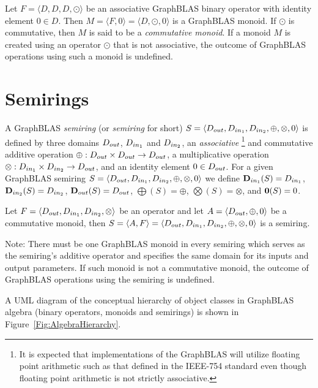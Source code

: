 Let $F = \langle D,D,D,\odot \rangle$ be an associative GraphBLAS binary operator
with identity element $0 \in D$.  Then $M = \langle F,0 \rangle = \langle
D,\odot,0 \rangle$ is a GraphBLAS monoid. If $\odot$ is commutative,
then $M$ is said to be a \emph{commutative monoid}.
If a monoid $M$ is created using an operator $\odot$ that is
not associative, the outcome of GraphBLAS operations using such a monoid is undefined.

\section{Semirings}

A GraphBLAS \emph{semiring} (or \emph{semiring} for short)
$S=\langle \mbox{$D_{out}$}, \mbox{$D_{in_{1}}$}, \mbox{$D_{in_{2}}$}, \oplus, \otimes, 0 \rangle$ is defined by
three domains $\mbox{$D_{out}$}$, $\mbox{$D_{in_{1}}$}$ and $\mbox{$D_{in_{2}}$}$, an \emph{associative}
\footnote{\label{Foot:associative}It is expected 
that implementations of the GraphBLAS will utilize floating point arithmetic 
such as that defined in the IEEE-754 standard even though
floating point arithmetic is not strictly associative.} 
and commutative
additive operation $\oplus : \mbox{$D_{out}$} \times \mbox{$D_{out}$} \rightarrow \mbox{$D_{out}$}$, 
a multiplicative operation $\otimes : \mbox{$D_{in_{1}}$} \times \mbox{$D_{in_{2}}$} \rightarrow
\mbox{$D_{out}$}$, and an identity element $0 \in \mbox{$D_{out}$}$.
For a given GraphBLAS semiring $S=\langle \mbox{$D_{out}$}, \mbox{$D_{in_{1}}$},
\mbox{$D_{in_{2}}$}, \oplus,\otimes,0 \rangle$ we define $\mbox{$\mathbf{D}_{in_{1}}$}(S) = \mbox{$D_{in_{1}}$}$,
$\mbox{$\mathbf{D}_{in_{2}}$}(S) = \mbox{$D_{in_{2}}$}$, $\mbox{$\mathbf{D}_{out}$}(S) = \mbox{$D_{out}$}$, $\mathbf{\bigoplus}(S) =
\oplus$, $\mathbf{\bigotimes}(S) = \otimes$, and ${\bf 0}(S) = 0$. 

Let $F = \langle \mbox{$D_{out}$},\mbox{$D_{in_{1}}$},\mbox{$D_{in_{2}}$},\otimes \rangle$ be an operator
and let $A = \langle \mbox{$D_{out}$},\oplus,0 \rangle$ be a commutative monoid,
then $S= \langle A,F \rangle = \langle \mbox{$D_{out}$},\mbox{$D_{in_{1}}$},\mbox{$D_{in_{2}}$},\oplus,\otimes,0 \rangle$
is a semiring.

Note: There must be one GraphBLAS monoid in every semiring which 
serves as the semiring's additive operator and  
specifies the same domain for its inputs and output parameters. 
If such monoid is not a commutative monoid, the outcome of GraphBLAS
operations using the semiring is undefined.

A UML diagram of the conceptual hierarchy of object classes in GraphBLAS
algebra (binary operators, monoids and semirings) is shown in 
Figure~\ref{Fig:AlgebraHierarchy}.

